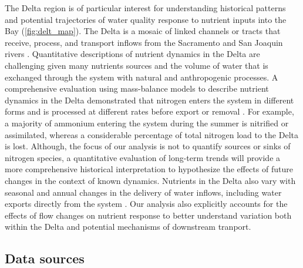 \documentclass[journal = esthag, manuscript = article]{achemso}\usepackage[]{graphicx}\usepackage[]{color}
\begin{document}
The Delta region is of particular interest for understanding historical patterns and potential trajectories of water quality response to nutrient inputs into the Bay (\cref{fig:delt_map}).  The Delta is a mosaic of linked channels or tracts that receive, process, and transport inflows from the Sacramento and San Joaquin rivers \cite{Jassby00,Jassby08,Novick15}.  Quantitative descriptions of nutrient dynamics in the Delta are challenging given many nutrients sources and the volume of water that is exchanged through the system with natural and anthropogenic processes.  A comprehensive evaluation using mass-balance models to describe nutrient dynamics in the Delta demonstrated that nitrogen enters the system in different forms and is processed at different rates before export or removal \cite{Novick15}. For example, a majority of ammonium entering the system during the summer is nitrified or assimilated, whereas a considerable percentage of total nitrogen load to the Delta is lost.  Although, the focus of our analysis is not to quantify sources or sinks of nitrogen species, a quantitative evaluation of long-term trends will provide a more comprehensive historical interpretation to hypothesize the effects of future changes in the context of known dynamics.  Nutrients in the Delta also vary with seasonal and annual changes in the delivery of water inflows, including water exports directly from the system \cite{Jassby00,Jassby08}.  Our analysis also explicitly accounts for the effects of flow changes on nutrient response to better understand variation both within the Delta and potential mechanisms of downstream tranport. 

\subsection{Data sources}

\end{document}
